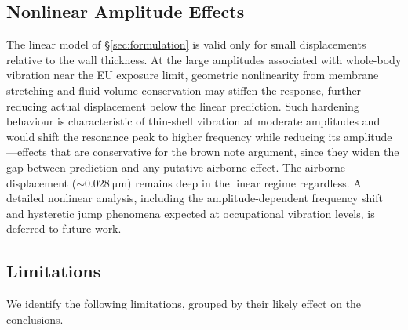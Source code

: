 \subsection{Nonlinear Amplitude Effects}
\label{sec:disc:nonlinear}

The linear model of \S\ref{sec:formulation} is valid only for small
displacements relative to the wall thickness.  At the large amplitudes
associated with whole-body vibration near the EU exposure limit, geometric
nonlinearity from membrane stretching and fluid volume conservation may
stiffen the response, further reducing actual displacement below the linear
prediction.  Such hardening behaviour is characteristic of thin-shell
vibration at moderate amplitudes \cite{Alijani2014} and would shift the
resonance peak to higher frequency while reducing its amplitude---effects that
are conservative for the brown note argument, since they widen the gap between
prediction and any putative airborne effect.  The airborne displacement
($\sim\SI{0.028}{\micro\metre}$) remains deep in the linear regime regardless.
A detailed nonlinear analysis, including the amplitude-dependent frequency
shift and hysteretic jump phenomena expected at occupational vibration
levels, is deferred to future work.

\subsection{Limitations}
\label{sec:disc:limitations}

We identify the following limitations, grouped by their likely effect on
the conclusions.

